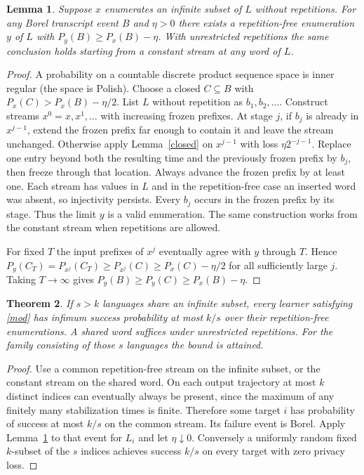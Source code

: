 \documentclass[11pt]{article}
\newtheorem{theorem}{Theorem}
\newtheorem{lemma}[theorem]{Lemma}
\begin{document}
\begin{lemma}\label{extend}
Suppose $x$ enumerates an infinite subset of $L$ without repetitions. For any Borel transcript event $B$ and $\eta>0$ there exists a repetition-free enumeration $y$ of $L$ with $P_y(B)\ge P_x(B)-\eta$. With unrestricted repetitions the same conclusion holds starting from a constant stream at any word of $L$.
\end{lemma}
\begin{proof}
A probability on a countable discrete product sequence space is inner regular (the space is Polish). Choose a closed $C\subseteq B$ with $P_x(C)>P_x(B)-\eta/2$. List $L$ without repetition as $b_1,b_2,\ldots$. Construct streams $x^0=x,x^1,\ldots$ with increasing frozen prefixes. At stage $j$, if $b_j$ is already in $x^{j-1}$, extend the frozen prefix far enough to contain it and leave the stream unchanged. Otherwise apply Lemma~\ref{closed} on $x^{j-1}$ with loss $\eta 2^{-j-1}$. Replace one entry beyond both the resulting time and the previously frozen prefix by $b_j$, then freeze through that location. Always advance the frozen prefix by at least one. Each stream has values in $L$ and in the repetition-free case an inserted word was absent, so injectivity persists. Every $b_j$ occurs in the frozen prefix by its stage. Thus the limit $y$ is a valid enumeration. The same construction works from the constant stream when repetitions are allowed.

For fixed $T$ the input prefixes of $x^j$ eventually agree with $y$ through $T$. Hence $P_y(C_T)=P_{x^j}(C_T)\ge P_{x^j}(C)\ge P_x(C)-\eta/2$ for all sufficiently large $j$. Taking $T\to\infty$ gives $P_y(B)\ge P_y(C)\ge P_x(B)-\eta$.
\end{proof}

\begin{theorem}\label{minimax}
If $s>k$ languages share an infinite subset, every learner satisfying \eqref{mod} has infimum success probability at most $k/s$ over their repetition-free enumerations. A shared word suffices under unrestricted repetitions. For the family consisting of those $s$ languages the bound is attained.
\end{theorem}
\begin{proof}
Use a common repetition-free stream on the infinite subset, or the constant stream on the shared word. On each output trajectory at most $k$ distinct indices can eventually always be present, since the maximum of any finitely many stabilization times is finite. Therefore some target $i$ has probability of success at most $k/s$ on the common stream. Its failure event is Borel. Apply Lemma~\ref{extend} to that event for $L_i$ and let $\eta\downarrow0$. Conversely a uniformly random fixed $k$-subset of the $s$ indices achieves success $k/s$ on every target with zero privacy loss.
\end{proof}
\end{document}
